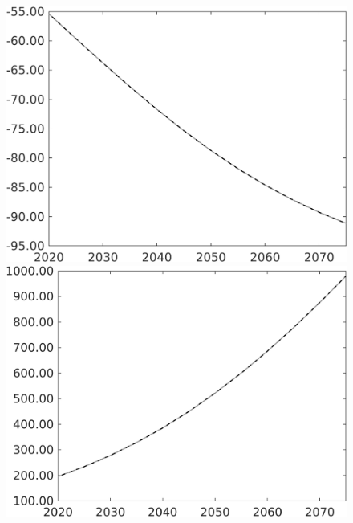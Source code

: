 \documentclass[12pt]{article}
\begin{document}
\begin{figure}[h!!]
\begin{minipage}[]{0.32\textwidth}
	\end{minipage}	
		\begin{minipage}[]{0.32\textwidth}
		\includegraphics[width=1\textwidth]{../../codding_model/own_basedOnFried/optimalPol_010922_revision/figures/all_13Sept22/PerdifNoTauf_Equlab_regime0_CompTaul_F_spillover0_nsk1_xgr1_knspil1_sep1_LFlimit0_emsbase0_countec0_GovRev0_etaa0.79_lgd0.png}
	\end{minipage}	
\begin{minipage}[]{0.32\textwidth}
\includegraphics[width=1\textwidth]{../../codding_model/own_basedOnFried/optimalPol_010922_revision/figures/all_13Sept22/PerdifNoTauf_Equlab_regime0_CompTaul_G_spillover0_nsk1_xgr1_knspil1_sep1_LFlimit0_emsbase0_countec0_GovRev0_etaa0.79_lgd0.png}

\end{minipage}
\end{figure}
\end{document}
